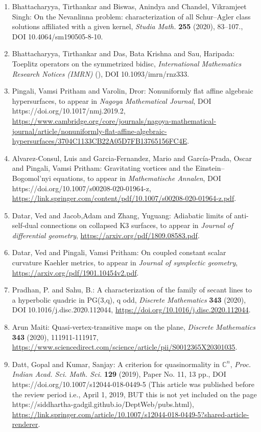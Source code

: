 \begin{enumerate}
\item Bhattacharyya, Tirthankar and Biswas, Anindya and Chandel, Vikramjeet Singh: On the Nevanlinna problem: characterization of all Schur–Agler class solutions affiliated with a given kernel, \emph{Studia Math.} {\bf 255} (2020), 83–107., DOI 10.4064/sm190505-8-10.
\item Bhattacharyya, Tirthankar and Das, Bata Krishna and Sau, Haripada: Toeplitz operators on the symmetrized bidisc, \emph{International Mathematics Research Notices (IMRN)} {\bf } (), DOI 10.1093/imrn/rnz333.
\item Pingali, Vamsi Pritham and Varolin, Dror: Nonuniformly flat affine algebraic hypersurfaces, to appear in \emph{Nagoya Mathematical Journal}, DOI https://doi.org/10.1017/nmj.2019.2, \url{https://www.cambridge.org/core/journals/nagoya-mathematical-journal/article/nonuniformly-flat-affine-algebraic-hypersurfaces/3704C1133CB22A05D7FB13765156FC4E}.
\item Alvarez-Consul, Luis and Garcia-Fernandez, Mario  and García-Prada, Oscar and Pingali, Vamsi Pritham: Gravitating vortices and the Einstein–Bogomol’nyi equations, to appear in \emph{Mathematische Annalen}, DOI https://doi.org/10.1007/s00208-020-01964-z, \url{https://link.springer.com/content/pdf/10.1007/s00208-020-01964-z.pdf}.
\item Datar, Ved and Jacob,Adam and Zhang, Yuguang: Adiabatic limits of anti-self-dual connections on collapsed K3 surfaces, to appear in \emph{Journal of differential geometry}, \url{https://arxiv.org/pdf/1809.08583.pdf}.
\item Datar, Ved and Pingali, Vamsi Pritham: On coupled constant scalar curvature Kaehler metrics, to appear in \emph{Journal of symplectic geometry}, \url{https://arxiv.org/pdf/1901.10454v2.pdf}.
\item Pradhan, P. and Sahu, B.: A characterization of the family of secant lines to a hyperbolic quadric in PG(3,q), q odd, \emph{Discrete Mathematics} {\bf 343} (2020), DOI 10.1016/j.disc.2020.112044, \url{https://doi.org/10.1016/j.disc.2020.112044}.
\item Arun Maiti: Quasi-vertex-transitive maps on the plane, \emph{Discrete Mathematics} {\bf 343} (2020), 111911-111917, \url{https://www.sciencedirect.com/science/article/pii/S0012365X20301035}.
\item Datt, Gopal and Kumar, Sanjay: A criterion for quasinormality in $\mathbb{C}^n$, \emph{Proc. Indian Acad. Sci. Math. Sci.} {\bf 129} (2019), Paper No. 11, 13 pp., DOI https://doi.org/10.1007/s12044-018-0449-5     (This article was published before the review period i.e., April 1, 2019, BUT this is not yet included on the page  https://siddhartha-gadgil.github.io/DeptWeb/pubs.html), \url{https://link.springer.com/article/10.1007/s12044-018-0449-5?shared-article-renderer}.

\end{enumerate}
